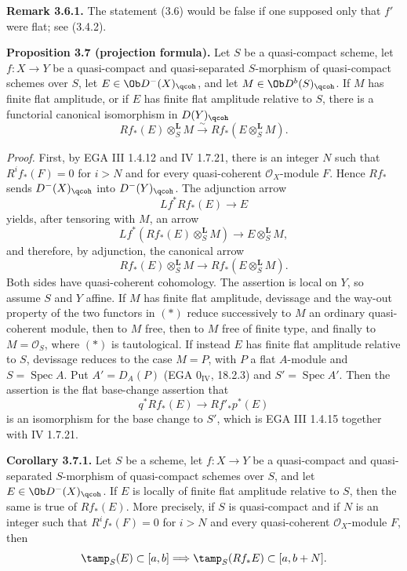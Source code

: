 \documentclass[11pt]{article}
\newcommand{\Spec}{\operatorname{Spec}}
\begin{document}
\textbf{Remark 3.6.1.} The statement (3.6) would be false if one supposed only that \(f'\) were flat; see (3.4.2).

\textbf{Proposition 3.7 (projection formula).} Let \(S\) be a quasi-compact scheme, let \(f:X\to Y\) be a quasi-compact and quasi-separated \(S\)-morphism of quasi-compact schemes over \(S\), let \(E\in\Ob D^{-}(X)_{\qcoh}\), and let \(M\in\Ob D^b(S)_{\qcoh}\). If \(M\) has finite flat amplitude, or if \(E\) has finite flat amplitude relative to \(S\), there is a functorial canonical isomorphism in \(D(Y)_{\qcoh}\)
\[
 Rf_*(E)\otimes_S^{\mathbf L}M
 \xrightarrow{\sim}
 Rf_*(E\otimes_S^{\mathbf L}M).
\]

\emph{Proof.} First, by EGA III 1.4.12 and IV 1.7.21, there is an integer \(N\) such that \(R^if_*(F)=0\) for \(i>N\) and for every quasi-coherent \(\mathcal O_X\)-module \(F\). Hence \(Rf_*\) sends \(D^{-}(X)_{\qcoh}\) into \(D^{-}(Y)_{\qcoh}\). The adjunction arrow
\[
 Lf^*Rf_*(E)\longrightarrow E
\]
yields, after tensoring with \(M\), an arrow
\[
 Lf^*(Rf_*(E)\otimes_S^{\mathbf L}M)
 \longrightarrow E\otimes_S^{\mathbf L}M,
\]
and therefore, by adjunction, the canonical arrow
\[
 Rf_*(E)\otimes_S^{\mathbf L}M
 \longrightarrow Rf_*(E\otimes_S^{\mathbf L}M).\tag{*}
\]
Both sides have quasi-coherent cohomology. The assertion is local on \(Y\), so assume \(S\) and \(Y\) affine. If \(M\) has finite flat amplitude, devissage and the way-out property of the two functors in \((*)\) reduce successively to \(M\) an ordinary quasi-coherent module, then to \(M\) free, then to \(M\) free of finite type, and finally to \(M=\mathcal O_S\), where \((*)\) is tautological. If instead \(E\) has finite flat amplitude relative to \(S\), devissage reduces to the case \(M=P\), with \(P\) a flat \(A\)-module and \(S=\Spec A\). Put \(A'=D_A(P)\) (EGA \(0_{\mathrm{IV}}\), 18.2.3) and \(S'=\Spec A'\). Then the assertion is the flat base-change assertion that
\[
 q^*Rf_*(E)\longrightarrow Rf'_*p^*(E)
\]
is an isomorphism for the base change to \(S'\), which is EGA III 1.4.15 together with IV 1.7.21.

\textbf{Corollary 3.7.1.} Let \(S\) be a scheme, let \(f:X\to Y\) be a quasi-compact and quasi-separated \(S\)-morphism of quasi-compact schemes over \(S\), and let \(E\in\Ob D^{-}(X)_{\qcoh}\). If \(E\) is locally of finite flat amplitude relative to \(S\), then the same is true of \(Rf_*(E)\). More precisely, if \(S\) is quasi-compact and if \(N\) is an integer such that \(R^if_*(F)=0\) for \(i>N\) and every quasi-coherent \(\mathcal O_X\)-module \(F\), then
\[
 \tamp_S(E)\subset[a,b]
 \Longrightarrow
 \tamp_S(Rf_*E)\subset[a,b+N].
\]
\end{document}
